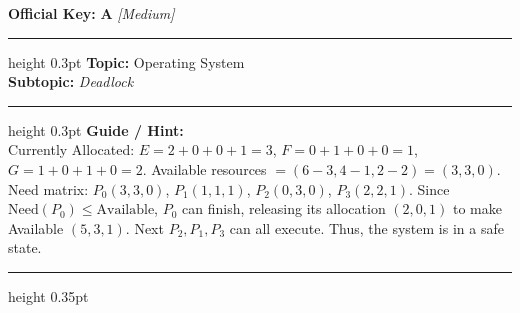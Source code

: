 \documentclass[a4paper,10pt]{article}
\begin{document}
\begin{tcolorbox}
\tcblower

\textbf{Official Key:} \textbf{\large A} \hfill \textit{\small [Medium]}
\vspace{2pt}\hrule height 0.3pt\vspace{3pt}
\textbf{Topic:} Operating System \\
\textbf{Subtopic:} \textit{Deadlock}
\vspace{2pt}\hrule height 0.3pt\vspace{3pt}
\textbf{Guide / Hint:} \\
{\small Currently Allocated: $E = 2+0+0+1 = 3$, $F = 0+1+0+0 = 1$, $G = 1+0+1+0 = 2$. Available resources $= (6-3, 4-1, 2-2) = (3, 3, 0)$. Need matrix: $P_0(3, 3, 0)$, $P_1(1, 1, 1)$, $P_2(0, 3, 0)$, $P_3(2, 2, 1)$. Since $\text{Need}(P_0) \le \text{Available}$, $P_0$ can finish, releasing its allocation $(2, 0, 1)$ to make Available $(5, 3, 1)$. Next $P_2, P_1, P_3$ can all execute. Thus, the system is in a safe state.}

\end{tcolorbox}
\vspace{6pt}\hrule height 0.35pt\vspace{6pt}
\noindent
\end{document}
